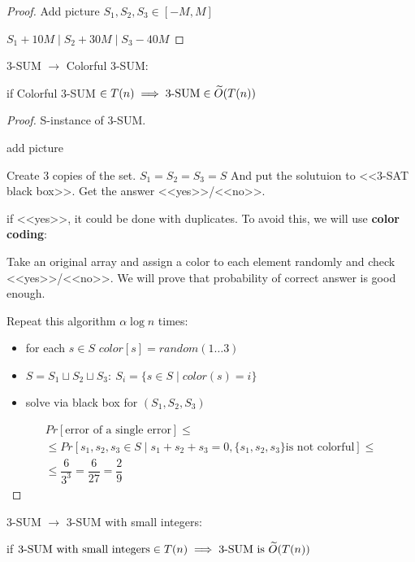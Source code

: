 \begin{proof}
	{\color{red} Add picture}
	$S_1, S_2, S_3 \in [-M, M]$ 
	
	$S_1 + 10M \mid S_2 + 30M \mid S_3 - 40M$ 
\end{proof}

\begin{lm}
	3-SUM $\to$ Colorful 3-SUM: 

	if Colorful 3-SUM $\in T(n) \implies \text{3-SUM} \in \widetilde{O}(T(n))$ 
\end{lm}

\begin{proof}
	S-instance of 3-SUM.

	{\color{red} add picture}

	Create 3 copies of the set. $S_1 = S_2 = S_3 = S$ And put the solutuion to <<3-SAT black box>>. Get the answer <<yes>>/<<no>>.

	if <<yes>>, it could be done with duplicates. To avoid this, we will use \textbf{color coding}:

	Take an original array and assign a color to each element randomly and check <<yes>>/<<no>>.
	We will prove that probability of correct answer is good enough.

	Repeat this algorithm $\alpha \log n$ times:
	\begin{itemize}
		\item for each $s \in S$ $color[s] = random(1 \ldots 3)$ 
		\item $S = S_1 \sqcup S_2 \sqcup S_3: \ S_i = \{s \in S \mid color(s) = i\}$
		\item solve via black box for $(S_1, S_2, S_3)$ 
	\end{itemize}
	\begin{align*}
		Pr[\text{error of a single error}] \le \\ \le Pr[s_1, s_2, s_3 \in S \mid s_1 + s_2 + s_3 = 0, \{s_1, s_2, s_3\} \text{is not colorful}] \le \\ \le \dfrac{6}{3^3} = \dfrac{6}{27} = \dfrac{2}{9}
	\end{align*}
\end{proof}

\begin{lm}
	3-SUM $\to$ 3-SUM with small integers:

	if $\text{3-SUM with small integers} \in T(n) \implies \text{3-SUM}\text{ is }\widetilde{O}(T(n))$ 


\end{lm}

